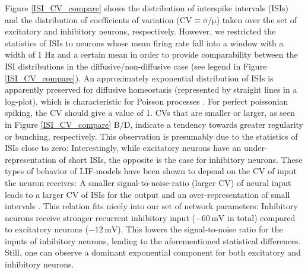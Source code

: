 \documentclass[10pt,a4paper]{article}
\begin{document}
Figure \ref{ISI_CV_compare} shows the distribution of interspike intervals (ISIs) and the distribution of coefficients of variation ($\mathrm{CV\equiv\sigma/\mu}$) taken over the set of excitatory and inhibitory neurons, respectively. However, we restricted the statistics of ISIs to neurons whose mean firing rate fall into a window with a width of 1 Hz and a certain mean in order to provide comparability between the ISI distributions in the diffusive/non-diffusive case (see legend in Figure \ref{ISI_CV_compare}). An approximately exponential distribution of ISIs is apparently preserved for diffusive homeostasis (represented by straight lines in a log-plot), which is characteristic for Poisson processes \cite[p. 27]{Theor_Neur_Dayan}. For perfect poissonian spiking, the CV should give a value of 1. CVs that are smaller or larger, as seen in Figure \ref{ISI_CV_compare} B/D, indicate a tendency towards greater regularity or bunching, respectively. This observation is presumably due to the statistics of ISIs close to zero: Interestingly, while excitatory neurons have an  under-representation of short ISIs, the opposite is the case for inhibitory neurons. These types of behavior of LIF-models have been shown to depend on the CV of input the neuron receives: A smaller signal-to-noise-ratio (larger CV) of neural input leads to a larger CV of ISIs for the output and an over-representation of small intervals \cite{Ostojic2011}. This relation fits nicely into our set of network parameters: Inhibitory neurons receive stronger recurrent inhibitory input ($\mathrm{-60\,mV}$ in total) compared to excitatory neurons ($\mathrm{-12\,mV}$). This lowers the signal-to-noise ratio for the inputs of inhibitory neurons, leading to the aforementioned statistical differences. Still, one can observe a dominant exponential component for both excitatory and inhibitory neurons.
\end{document}
